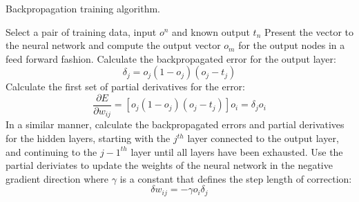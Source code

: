\begin{algorithm}[htb!]
\caption{Backpropagation training algorithm.}
\label{backpropAlg}    
\begin{algorithmic}

\STATE Select a pair of training data, input $o^n$ and known output $t_n$
\STATE Present the vector to the neural network and compute the
output vector $o_m$ for the output nodes in a feed forward fashion.
\STATE Calculate the backpropagated error for the output layer: 
\begin{displaymath}
\delta_j = o_j(1 - o_j)(o_j -t_j) 
\end{displaymath} 
\STATE Calculate the first set of partial derivatives for the error:
\begin{displaymath}
\frac{\partial E}{\partial w_{ij}} = [o_j(1 - o_j)(o_j - t_j)]o_i =
\delta_j o_i
\end{displaymath} 
\STATE In a similar manner, calculate the backpropagated errors and
partial derivatives for the
hidden layers, starting with the $j^{th}$ layer connected to the
output layer, and continuing to the $j-1^{th}$ layer until all layers
have been exhausted.
\STATE Use the partial deriviates to update the weights of the
neural network in the negative gradient direction where $\gamma$ is a
constant that defines the step length of correction:
\begin{displaymath}
\delta w_{ij} = - \gamma o_i \delta_j
\end{displaymath}
\ENDWHILE
\end{algorithmic}
\end{algorithm}
